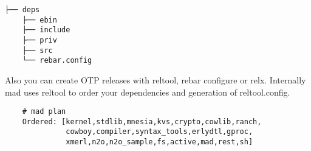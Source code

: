 \vspace{1\baselineskip}
\begin{lstlisting}[caption=OTP Application]
    ├── deps
    ├── ebin
    ├── include
    ├── priv
    ├── src
    └── rebar.config
\end{lstlisting}
\vspace{1\baselineskip}

Also you can create OTP releases with reltool, rebar configure or relx.
Internally mad uses reltool to order your dependencies and generation of reltool.config.

\vspace{1\baselineskip}
\begin{lstlisting}
    # mad plan
    Ordered: [kernel,stdlib,mnesia,kvs,crypto,cowlib,ranch,
              cowboy,compiler,syntax_tools,erlydtl,gproc,
              xmerl,n2o,n2o_sample,fs,active,mad,rest,sh]
\end{lstlisting}
\vspace{1\baselineskip}
